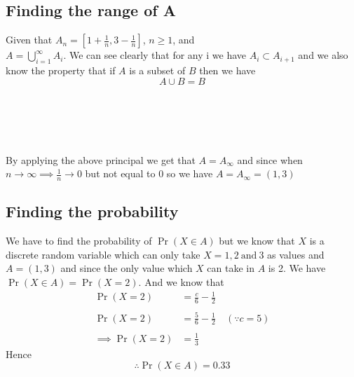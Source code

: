 \documentclass[journal,12pt,twocolumn]{IEEEtran}
\providecommand{\brak}[1]{\ensuremath{\left(#1\right)}}
\begin{document}
\subsection{Finding the range of A}
Given that $A_n = \left[1+\frac{1}{n},3-\frac{1}{n}\right]$, $n\geq1$, and \\$A = \bigcup_{i=1}^{\infty}A_i$. We can see clearly that for any i we have $A_i \subset A_{i+1}$ and we also know the property that if $A$ is a subset of $B$ then we have $$A\cup B = B$$\\\\\\\\\\
By applying the above principal we get that $A = A_\infty$ and since when $n \rightarrow \infty \implies \frac{1}{n} \rightarrow 0$ but not equal to 0 so we have $A = A_\infty = \brak{1,3}$

\subsection{Finding the probability }
We have to find the probability of  $\Pr\brak{X \in A}$ but we know that $X$ is a discrete random variable which can only take $X =1,2 \: \text{and}\: 3 $ as values and $A = \brak{1,3} $ and since the only value which $X$ can take in $A$ is 2. We have $\Pr\brak{X\in A} = \Pr\brak{X = 2}$. And we know that  
\begin{align}
\nonumber \Pr\brak{X =2 } &= \frac{c}{6} - \frac{1}{2}\\
\nonumber \\
\nonumber \Pr\brak{X =2 } &= \frac{5}{6} - \frac{1}{2} \quad \brak{\because c =5}\\
\nonumber \\
\nonumber \implies \Pr\brak{X = 2} &= \frac{1}{3}
\end{align}
Hence \\$$\therefore \Pr\brak{X \in A} = 0.33$$
\end{document}
